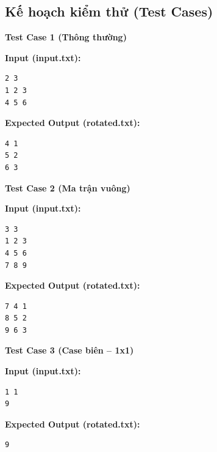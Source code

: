 \subsection{Kế hoạch kiểm thử (Test Cases)}

\textbf{Test Case 1 (Thông thường)}

\textbf{Input (input.txt):}
\begin{lstlisting}
2 3
1 2 3
4 5 6
\end{lstlisting}

\textbf{Expected Output (rotated.txt):}
\begin{lstlisting}
4 1
5 2
6 3
\end{lstlisting}

\vspace{0.5cm}

\textbf{Test Case 2 (Ma trận vuông)}

\textbf{Input (input.txt):}
\begin{lstlisting}
3 3
1 2 3
4 5 6
7 8 9
\end{lstlisting}

\textbf{Expected Output (rotated.txt):}
\begin{lstlisting}
7 4 1
8 5 2
9 6 3
\end{lstlisting}

\vspace{0.5cm}

\textbf{Test Case 3 (Case biên -- 1x1)}

\textbf{Input (input.txt):}
\begin{lstlisting}
1 1
9
\end{lstlisting}

\textbf{Expected Output (rotated.txt):}
\begin{lstlisting}
9
\end{lstlisting}
